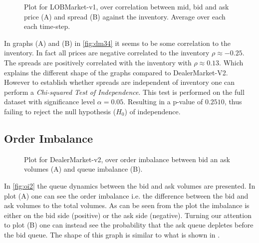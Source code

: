 \documentclass{kththesis}
\theoremstyle{definition}
\begin{document}
\begin{figure}[H]
	    	\centering
		
		\caption{Plot for LOBMarket-v1, over correlation between mid, bid and ask price (A) and spread (B) against the inventory. Average over each each time-step.}
		\label{fig:dm34}
\end{figure}
In graphs (A) and (B) in \autoref{fig:dm34} it seems to be some correlation to the inventory. In fact all prices are negative correlated to the inventory $\rho \approx -0.25$. The spreads are positively correlated with the inventory with $\rho\approx  0.13$. Which explains the different shape of the graphs compared to DealerMarket-V2. However to establish whether spreads are independent of inventory one can perform a \textit{Chi-squared Test of Independence}. This test is performed on the full dataset with significance level $\alpha = 0.05$. Resulting in a p-value of $0.2510$, thus failing to reject the null hypothesis ($H_{0}$) of independence. 

\subsection*{Order Imbalance}

\begin{figure}[H]
	    	\centering
		
		\caption{Plot for DealerMarket-v2, over order imbalance between bid an ask volumes (A) and queue imbalance (B).}
		\label{fig:oi2}
\end{figure}
In \autoref{fig:oi2} the queue dynamics between the bid and ask volumes are presented. In plot (A) one can see the order imbalance i.e. the difference between the bid and ask volumes to the total volumes. As can be seen from the plot the imbalance is either on the bid side (positive) or the ask side (negative). Turning our attention to plot (B) one can instead see the probability that the ask queue depletes before the bid queue. The shape of this graph is similar to what is shown in \parencite{bouchaud2018trades}.
\end{document}
